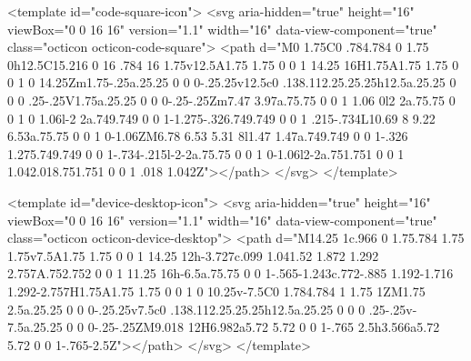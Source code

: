 <template id="code-square-icon">
  <svg aria-hidden="true" height="16" viewBox="0 0 16 16" version="1.1" width="16" data-view-component="true" class="octicon octicon-code-square">
    <path d="M0 1.75C0 .784.784 0 1.75 0h12.5C15.216 0 16 .784 16 1.75v12.5A1.75 1.75 0 0 1 14.25 16H1.75A1.75 1.75 0 0 1 0 14.25Zm1.75-.25a.25.25 0 0 0-.25.25v12.5c0 .138.112.25.25.25h12.5a.25.25 0 0 0 .25-.25V1.75a.25.25 0 0 0-.25-.25Zm7.47 3.97a.75.75 0 0 1 1.06 0l2 2a.75.75 0 0 1 0 1.06l-2 2a.749.749 0 0 1-1.275-.326.749.749 0 0 1 .215-.734L10.69 8 9.22 6.53a.75.75 0 0 1 0-1.06ZM6.78 6.53 5.31 8l1.47 1.47a.749.749 0 0 1-.326 1.275.749.749 0 0 1-.734-.215l-2-2a.75.75 0 0 1 0-1.06l2-2a.751.751 0 0 1 1.042.018.751.751 0 0 1 .018 1.042Z"></path>
</svg>
</template>

<template id="device-desktop-icon">
  <svg aria-hidden="true" height="16" viewBox="0 0 16 16" version="1.1" width="16" data-view-component="true" class="octicon octicon-device-desktop">
    <path d="M14.25 1c.966 0 1.75.784 1.75 1.75v7.5A1.75 1.75 0 0 1 14.25 12h-3.727c.099 1.041.52 1.872 1.292 2.757A.752.752 0 0 1 11.25 16h-6.5a.75.75 0 0 1-.565-1.243c.772-.885 1.192-1.716 1.292-2.757H1.75A1.75 1.75 0 0 1 0 10.25v-7.5C0 1.784.784 1 1.75 1ZM1.75 2.5a.25.25 0 0 0-.25.25v7.5c0 .138.112.25.25.25h12.5a.25.25 0 0 0 .25-.25v-7.5a.25.25 0 0 0-.25-.25ZM9.018 12H6.982a5.72 5.72 0 0 1-.765 2.5h3.566a5.72 5.72 0 0 1-.765-2.5Z"></path>
</svg>
</template>

